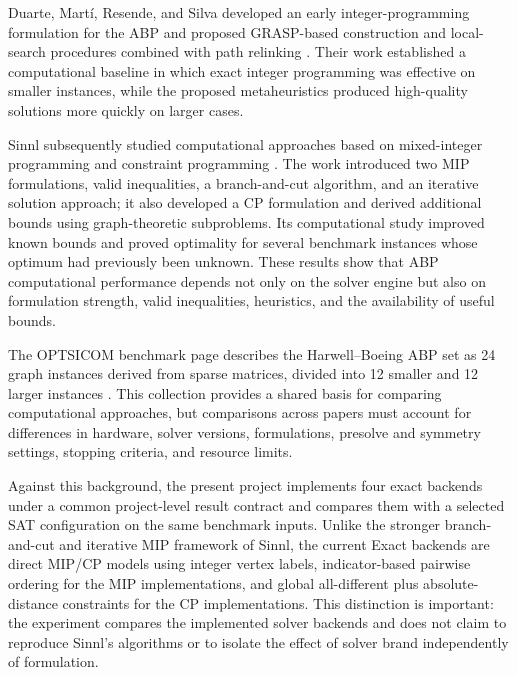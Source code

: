 Duarte, Martí, Resende, and Silva developed an early integer-programming formulation for the ABP and proposed GRASP-based construction and local-search procedures combined with path relinking \citep{Duarte2011}. Their work established a computational baseline in which exact integer programming was effective on smaller instances, while the proposed metaheuristics produced high-quality solutions more quickly on larger cases.

Sinnl subsequently studied computational approaches based on mixed-integer programming and constraint programming \citep{Sinnl2021}. The work introduced two MIP formulations, valid inequalities, a branch-and-cut algorithm, and an iterative solution approach; it also developed a CP formulation and derived additional bounds using graph-theoretic subproblems. Its computational study improved known bounds and proved optimality for several benchmark instances whose optimum had previously been unknown. These results show that ABP computational performance depends not only on the solver engine but also on formulation strength, valid inequalities, heuristics, and the availability of useful bounds.

The OPTSICOM benchmark page describes the Harwell--Boeing ABP set as 24 graph instances derived from sparse matrices, divided into 12 smaller and 12 larger instances \citep{OptsicomABP}. This collection provides a shared basis for comparing computational approaches, but comparisons across papers must account for differences in hardware, solver versions, formulations, presolve and symmetry settings, stopping criteria, and resource limits.

Against this background, the present project implements four exact backends under a common project-level result contract and compares them with a selected SAT configuration on the same benchmark inputs. Unlike the stronger branch-and-cut and iterative MIP framework of Sinnl, the current Exact backends are direct MIP/CP models using integer vertex labels, indicator-based pairwise ordering for the MIP implementations, and global all-different plus absolute-distance constraints for the CP implementations. This distinction is important: the experiment compares the implemented solver backends and does not claim to reproduce Sinnl's algorithms or to isolate the effect of solver brand independently of formulation.
